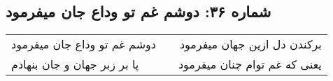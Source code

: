\begin{center}
\section*{شماره ۳۶: دوشم غم تو وداع جان میفرمود}
\label{sec:036}
\begin{longtable}{l p{0.5cm} r}
دوشم غم تو وداع جان میفرمود
&&
برکندن دل ازین جهان میفرمود
\\
پا بر زبر جهان و جان بنهادم
&&
یعنی که غم توام چنان میفرمود
\\
\end{longtable}
\end{center}
